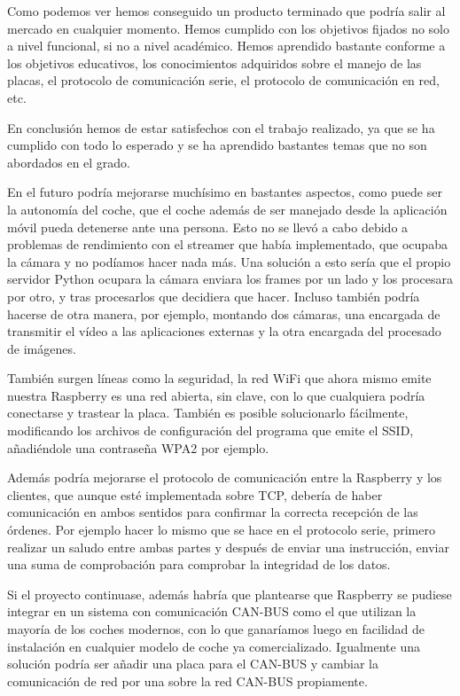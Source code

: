 \documentclass{pclass}
\begin{document}

	Como podemos ver hemos conseguido un producto terminado que podría salir al mercado en cualquier momento. Hemos cumplido con los objetivos fijados no solo a nivel funcional, si no a nivel académico. Hemos aprendido bastante conforme a los objetivos educativos, los conocimientos adquiridos sobre el manejo de las placas, el protocolo de comunicación serie, el protocolo de comunicación en red, etc. 
	
	En conclusión hemos de estar satisfechos con el trabajo realizado, ya que se ha cumplido con todo lo esperado y se ha aprendido bastantes temas que no son abordados en el grado.



	En el futuro podría mejorarse muchísimo en bastantes aspectos, como puede ser la autonomía del coche, que el coche además de ser manejado desde la aplicación móvil pueda detenerse ante una persona. Esto no se llevó a cabo debido a problemas de rendimiento con el streamer que había implementado, que ocupaba la cámara y no podíamos hacer nada más. Una solución a esto sería que el propio servidor Python ocupara la cámara enviara los frames por un lado y los procesara por otro, y tras procesarlos que decidiera que hacer.
	Incluso también podría hacerse de otra manera, por ejemplo, montando dos cámaras, una encargada de transmitir el vídeo a las aplicaciones externas y la otra encargada del procesado de imágenes.
	
	También surgen líneas como la seguridad, la red WiFi que ahora mismo emite nuestra Raspberry es una red abierta, sin clave, con lo que cualquiera podría conectarse y trastear la placa. También es posible solucionarlo fácilmente, modificando los archivos de configuración del programa que emite el SSID, añadiéndole una contraseña WPA2 por ejemplo.
	
	Además podría mejorarse el protocolo de comunicación entre la Raspberry y los clientes, que aunque esté implementada sobre TCP, debería de haber comunicación en ambos sentidos para confirmar la correcta recepción de las órdenes. Por ejemplo hacer lo mismo que se hace en el protocolo serie, primero realizar un saludo entre ambas partes y después de enviar una instrucción, enviar una suma de comprobación para comprobar la integridad de los datos.
	
	Si el proyecto continuase, además habría que plantearse que Raspberry se pudiese integrar en un sistema con comunicación CAN-BUS como el que utilizan la mayoría de los coches modernos, con lo que ganaríamos luego en facilidad de instalación en cualquier modelo de coche ya comercializado. Igualmente una solución podría ser añadir una placa para el CAN-BUS y cambiar la comunicación de red por una sobre la red CAN-BUS propiamente.
\end{document}
